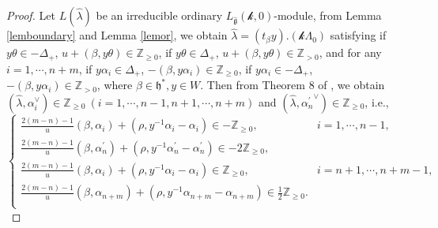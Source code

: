\documentclass[12pt]{article}
\begin{document}
\begin{proof}
Let $L(\hat{\lambda})$ be an irreducible ordinary $L_{\widehat{\mathfrak{g}}}(\mathcal{k},0)$-module,
from Lemma \ref{lemboundary} and Lemma \ref{lemor}, we obtain $\hat{\lambda}=(t_\beta y).(\mathcal{k}\Lambda_0)$
satisfying if $y\theta\in -\Delta_+$, $u+(\beta,y\theta)\in\mathbb{Z}_{\geq0}$,
if $y\theta\in \Delta_+$, $u+(\beta,y\theta)\in\mathbb{Z}_{>0}$,
and for any $i=1,\cdots,n+m$,
if $y\alpha_i\in \Delta_+$, $-(\beta,y\alpha_i)\in\mathbb{Z}_{\geq0}$,
if $y\alpha_i\in -\Delta_+$, $-(\beta,y\alpha_i)\in\mathbb{Z}_{>0}$,
where $\beta\in \mathfrak{h}^*, y\in W$.
Then from Theorem 8 of \cite{Kac77}, we obtain
$(\hat{\lambda}, \alpha_i^\vee)\in \mathbb{Z}_{\geq0} ~(i=1,\cdots,n-1,n+1,\cdots,n+m)$ and $(\hat{\lambda}, {\alpha_n^\prime}^\vee)\in \mathbb{Z}_{\geq0}$,
i.e.,
$$\begin{cases}
  \frac{2(m-n)-1}{u}(\beta,\alpha_i)+(\rho,y^{-1}\alpha_i-\alpha_i)\in -\mathbb{Z}_{\geq0},&i=1,\cdots,n-1,\\
 \frac{2(m-n)-1}{u}(\beta,\alpha_n^\prime)+(\rho,y^{-1}\alpha_n^\prime-\alpha_n^\prime)\in -2\mathbb{Z}_{\geq0},\\
  \frac{2(m-n)-1}{u}(\beta,\alpha_i)+(\rho,y^{-1}\alpha_i-\alpha_i)\in \mathbb{Z}_{\geq0},&i=n+1,\cdots,n+m-1,\\
 \frac{2(m-n)-1}{u}(\beta,\alpha_{n+m})+(\rho,y^{-1}\alpha_{n+m}-\alpha_{n+m})\in \frac{1}{2}\mathbb{Z}_{\geq0}.\\
\end{cases}$$


\end{proof}
\end{document}
